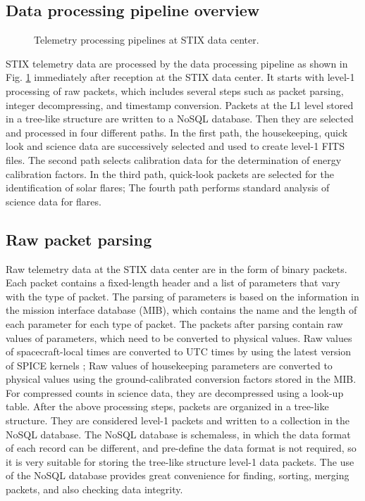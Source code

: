 \documentclass[referee]{preaa} %
\begin{document}
\subsection{Data processing pipeline overview}

\begin{figure}
    \centering
    \caption{Telemetry processing pipelines at STIX data center.}
    \label{fig:main_pipelines}
\end{figure}
STIX telemetry data are processed by the data processing pipeline  
as shown in Fig. \ref{fig:main_pipelines} immediately after reception at the STIX data center.  It starts with level-1 processing of raw packets, which includes several steps such as  packet parsing,  integer decompressing, and timestamp conversion. 
Packets at the L1 level stored in a tree-like structure  are written to a NoSQL database. Then they are selected and processed in four different paths. 
In the first path, the housekeeping, quick look and science data are successively selected and used to create level-1 FITS files. 
The second path selects calibration data for the determination
 of energy calibration factors.   In the third path, quick-look packets are selected  for the identification of solar  flares; 
The fourth path performs standard analysis of science data for flares.

\subsection{Raw packet parsing}
Raw telemetry data at the STIX data center are in the form of binary packets. 
Each packet contains a fixed-length header and a list of parameters that vary with the type of packet.  The parsing of parameters is based on the information in 
the mission interface database (MIB), which contains the name and the 
length of each parameter for each type of packet. 
The packets after parsing contain raw values of parameters, 
which need to be converted to physical values. 
Raw values of spacecraft-local times are converted to UTC times by using 
the latest version of SPICE kernels \citep{spice1996,spice2018};
Raw values of  housekeeping parameters are converted to physical values using 
the  ground-calibrated conversion factors stored in the MIB. 
For compressed counts in science data, they are decompressed using a look-up table. 
After the above processing steps, packets are organized in a tree-like structure. 
They are considered level-1 packets and written to a collection in the NoSQL database. 
The NoSQL database is schemaless, in which the data format of each record can be different, and pre-define the data format is not required, so it is very suitable for storing the tree-like structure level-1 data packets.  
The use of the NoSQL database provides great convenience for finding, sorting, merging packets, and also checking data integrity. 
\end{document}
